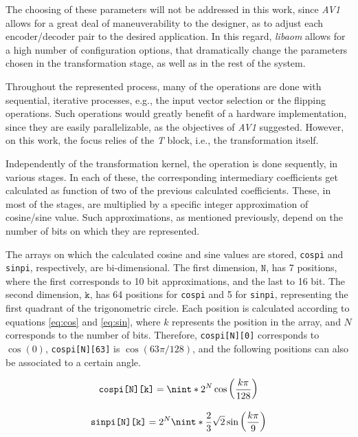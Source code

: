 The choosing of these parameters will not be addressed in this work, since \emph{AV1} allows for a great deal of maneuverability to the designer, as to adjust each encoder/decoder pair to the desired application. In this regard, \emph{libaom} allows for a high number of configuration options, that dramatically change the parameters chosen in the transformation stage, as well as in the rest of the system.

Throughout the represented process, many of the operations are done with sequential, iterative processes, e.g., the input vector selection or the flipping operations. Such operations would greatly benefit of a hardware implementation, since they are easily parallelizable, as the objectives of \emph{AV1} suggested. However, on this work, the focus relies of the \emph{T} block, i.e., the transformation itself.

Independently of the transformation kernel, the operation is done sequently, in various stages. In each of these, the corresponding intermediary coefficients get calculated as function of two of the previous calculated coefficients. These, in most of the stages, are multiplied by a specific integer approximation of cosine/sine value. Such approximations, as mentioned previously, depend on the number of bits on which they are represented. 

The arrays on which the calculated cosine and sine values are stored, \texttt{cospi} and \texttt{sinpi}, respectively, are bi-dimensional. The first dimension, $\texttt{N}$,  has 7 positions, where the first corresponds to 10 bit approximations, and the last to 16 bit. The second dimension, $\texttt{k}$, has 64 positions for \texttt{cospi} and 5 for \texttt{sinpi}, representing the first quadrant of the trigonometric circle. Each position is calculated according to equations \ref{eq:cos} and \ref{eq:sin}, where $k$ represents the position in the array, and $N$ corresponds to the number of bits. Therefore, \verb|cospi[N][0]| corresponds to $\cos(0)$, \verb|cospi[N][63]| is $\cos(63\pi/128)$, and the following positions can also be associated to a certain angle.

\begin{equation} \label{eq:cos}
    \texttt{cospi[N][k]} = \nint*{2^{N}\cos\left(\frac{k\pi}{128}\right)}
\end{equation}

\begin{equation} \label{eq:sin}
    \texttt{sinpi[N][k]} = 2^{N}\nint*{\frac{2}{3}\sqrt{2}\sin\left(\frac{k\pi}{9}\right)}
\end{equation}

